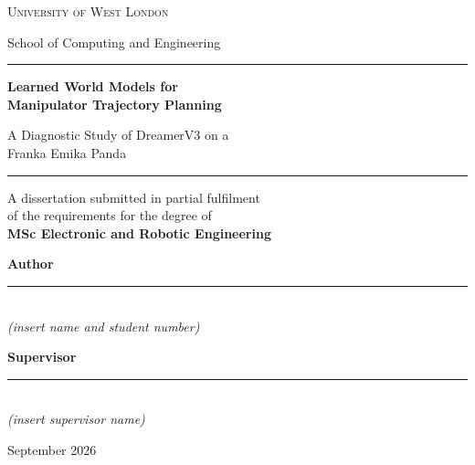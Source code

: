 \documentclass[12pt,a4paper,oneside]{report}
\begin{document}
\begin{titlepage}
\centering
\vspace*{0.6cm}

{\Large\scshape University of West London\par}
\vspace{0.4cm}
{\large School of Computing and Engineering\par}

\vspace{1.9cm}
\rule{\textwidth}{0.6pt}\par
\vspace{0.9cm}
{\Huge\bfseries Learned World Models for\\[0.35em]
 Manipulator Trajectory Planning\par}
\vspace{0.9cm}
{\Large A Diagnostic Study of DreamerV3 on a\\[0.2em]
 Franka Emika Panda\par}
\vspace{0.9cm}
\rule{\textwidth}{0.6pt}\par

\vspace{1.7cm}
{\large
A dissertation submitted in partial fulfilment\\
of the requirements for the degree of\\[0.6em]
\textbf{MSc Electronic and Robotic Engineering}\par}

\vfill

\begin{minipage}{0.46\textwidth}
\raggedright
\textbf{Author}\\
\rule{0.8\textwidth}{0.4pt}\\[0.2em]
{\small\itshape (insert name and student number)}
\end{minipage}
\hfill
\begin{minipage}{0.46\textwidth}
\raggedleft
\textbf{Supervisor}\\
\rule{0.8\textwidth}{0.4pt}\\[0.2em]
{\small\itshape (insert supervisor name)}
\end{minipage}

\vspace{1.1cm}
{\large September 2026\par}
\vspace*{0.4cm}
\end{titlepage}
\end{document}
